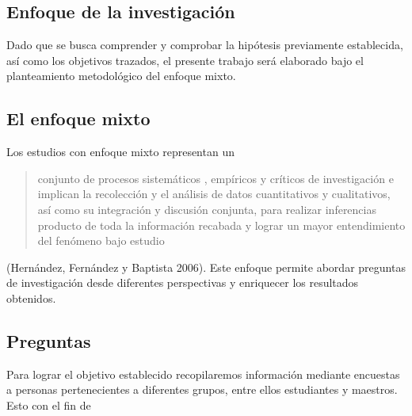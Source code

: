 \subsection{Enfoque de la investigación}
Dado que se busca comprender y comprobar la hipótesis previamente establecida,
así como los objetivos trazados, el presente trabajo será elaborado bajo el
planteamiento metodológico del enfoque mixto.
\subsection{El enfoque mixto}
Los estudios con enfoque mixto representan un 
\begin{quote}
conjunto de procesos sistemáticos , empíricos y críticos de investigación e
implican la recolección y el análisis de datos cuantitativos y cualitativos, así
como su integración y discusión conjunta, para realizar inferencias producto de
toda la información recabada y lograr un mayor entendimiento del fenómeno bajo
estudio
\end{quote}
(Hernández, Fernández
y Baptista 2006). Este enfoque permite abordar preguntas de investigación desde
diferentes perspectivas y enriquecer los resultados obtenidos.
\subsection{Preguntas}
Para lograr el objetivo establecido recopilaremos información mediante encuestas
a personas pertenecientes a diferentes grupos, entre ellos estudiantes y
maestros. Esto con el fin de
